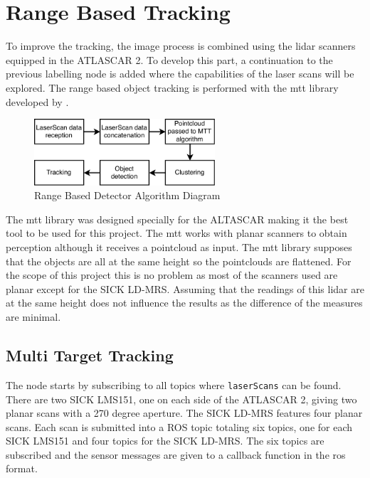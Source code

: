 \section{Range Based Tracking}

To improve the tracking, the image process is combined using the \gls{lidar} scanners equipped in the ATLASCAR 2. To develop this part, a continuation to the previous labelling node is added where the capabilities of the laser scans will be explored. The range based object tracking is performed with the \gls{mtt} library developed by \cite{SoaresDeAlmeida2016a}. 


\begin{figure}[htp]
	
	\centering
	\includegraphics[width=0.6\textwidth]{caplabel/imgs/mttdiagram.pdf}
	
	\caption{Range Based Detector Algorithm Diagram}
	\label{fig:mttdiagram}
	
\end{figure}


The \gls{mtt} library was designed specially for the ALTASCAR making it the best tool to be used for this project. The \gls{mtt} works with planar scanners to obtain perception although it receives a pointcloud as input. The \gls{mtt} library supposes that the objects are all at the same height so the pointclouds are flattened. For the scope of this project this is no problem as most of the scanners used are planar except for the SICK LD-MRS. Assuming that the readings of this \gls{lidar} are at the same height does not influence the results as the difference of the measures are minimal. 

\subsection{Multi Target Tracking}

The node starts by subscribing to all topics where \texttt{laserScans} can be found. There are two SICK LMS151, one on each side of the ATLASCAR 2, giving two planar scans with a 270 degree aperture. The SICK LD-MRS features four planar scans. Each scan is submitted into a ROS topic totaling six topics, one for each SICK LMS151 and four topics for the SICK LD-MRS. The six topics are subscribed and the sensor messages are given to a callback function in the \gls{ros} format.

